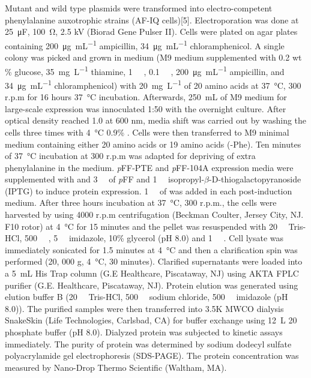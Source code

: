 \begin{refsection}
Mutant and wild type plasmids were transformed into electro-competent  phenylalanine auxotrophic strains (AF-IQ cells)[5]. Electroporation was
done at \SI{25}{\micro\farad}, \SI{100}{\ohm}, 2.5 kV (Biorad Gene Pulser II).
Cells were plated on agar plates containing \SI{200}{\ug\per\mL} ampicillin,
\SI{34}{\ug\per\mL} chloramphenicol. A single colony was picked and grown in
medium (M9 medium supplemented with 0.2 wt \% glucose, \SI{35}{\mg\per\L}
thiamine, \SI{1}{\milli\Molar} , \SI{0.1}{\milli\Molar} ,
\SI{200}{\ug\per\mL} ampicillin, and \SI{34}{\ug\per\mL} chloramphenicol) with
\SI{20}{\mg\per\L} of 20 amino acids at \SI{37}{\celsius}, 300 r.p.m for 16
hours \SI{37}{\celsius} incubation.  Afterwards, \SI{250}{\mL} of M9 medium for
large-scale expression was innoculated 1:50 with the overnight culture.  After
optical density reached 1.0 at 600 nm, media shift was carried out by washing
the cells three times with \SI{4}{\celsius} 0.9\% . Cells were then
transferred to M9 minimal medium containing either 20 amino acids or 19 amino
acids (-Phe). Ten minutes of \SI{37}{\celsius} incubation at 300 r.p.m was
adapted for depriving of extra phenylalanine in the medium. \emph{p}FF-PTE and
\emph{p}FF-104A expression media were supplemented with and
\SI{3}{\milli\Molar} of \emph{p}FF and \SI{1}{\milli\Molar}
isopropyl-$\beta$-D-thiogalactopyranoside (IPTG) to induce protein expression.
\SI{1}{\milli\Molar} of  was added in each post-induction medium.
After three hours incubation at \SI{37}{\celsius}, 300 r.p.m., the cells were
harvested by using 4000 r.p.m centrifugation (Beckman Coulter, Jersey City, NJ.
F10 rotor) at \SI{4}{\celsius} for 15 minutes and the pellet was resuspended
with \SI{20}{\milli\Molar} Tris-HCl, \SI{500}{\milli\Molar} ,
\SI{5}{\milli\Molar} imidazole, 10\% glycerol (pH 8.0) and \SI{1}{\micro\Molar}
. Cell lysate was immediately sonicated for 1.5 minutes at
\SI{4}{\celsius} and then a clarification spin was performed (20, 000 g,
\SI{4}{\celsius}, 30 minutes).  Clarified supernatants were loaded into a
\SI{5}{\mL} His Trap column (G.E Healthcare, Piscataway, NJ) using AKTA FPLC
purifier (G.E.  Healthcare, Piscataway, NJ).  Protein elution was generated
using elution buffer B (\SI{20}{\milli\Molar} Tris-HCl, \SI{500}{\milli\Molar}
sodium chloride, \SI{500}{\milli\Molar} imidazole (pH 8.0)).  The purified
samples were then transferred into 3.5K MWCO dialysis SnakeSkin (Life
Technologies, Carlsbad, CA) for buffer exchange using \SI{12}{\L}
\SI{20}{\milli\Molar} phosphate buffer (pH 8.0).  Dialyzed protein was
subjected to kinetic assays immediately. The purity of protein was determined
by sodium dodecyl sulfate polyacrylamide gel electrophoresis (SDS-PAGE). The
protein concentration was measured by Nano-Drop Thermo Scientific (Waltham,
MA). 


\end{refsection}
